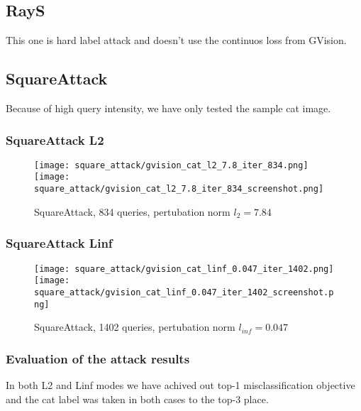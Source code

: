 \subsection{RayS}
This one is hard label attack and doesn't use the continuos loss from GVision.

\subsection{SquareAttack}
Because of high query intensity, we have only tested the sample cat image.


\subsubsection{SquareAttack L2}
\begin{figure}[!htb]
\null\hspace{1cm}
  \texttt{[image: square\_attack/gvision\_cat\_l2\_7.8\_iter\_834.png]}
\endminipage
\null\hspace{1cm}
  \texttt{[image: square\_attack/gvision\_cat\_l2\_7.8\_iter\_834\_screenshot.png]}
\endminipage
\caption{SquareAttack, 834 queries, pertubation norm $l_2 = 7.84$ }
\label{fig:square_cat_l2}
\end{figure}

\subsubsection{SquareAttack Linf}

\begin{figure}[!htb]
\null\hspace{1cm}
  \texttt{[image: square\_attack/gvision\_cat\_linf\_0.047\_iter\_1402.png]}
\endminipage
\null\hspace{1cm}
  \texttt{[image: square\_attack/gvision\_cat\_linf\_0.047\_iter\_1402\_screenshot.png]}
\endminipage
\caption{SquareAttack, 1402 queries, pertubation norm $l_{inf} = 0.047$}
\label{fig:square_cat_linf}
\end{figure}

\subsubsection{Evaluation of the attack results}

In both L2 and Linf modes we have achived out top-1 misclassification objective and the cat label was taken in both cases to the top-3 place.

